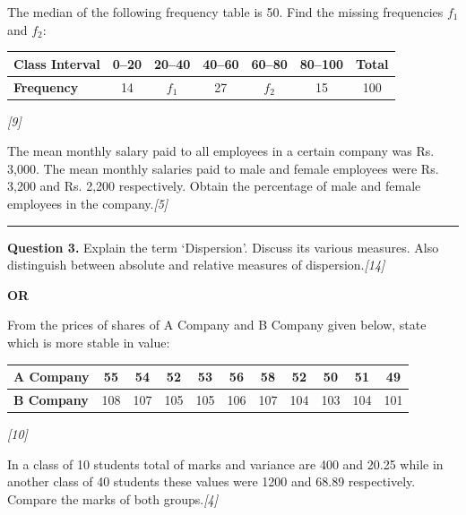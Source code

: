 \documentclass[11pt,a4paper]{article}
\newcommand{\pts}[1]{\hfill   \textit{[#1]}}
\begin{document}
\begin{parts}
  \item The median of the following frequency table is 50. Find the missing frequencies $f_1$ and $f_2$:
  
  
\begin{center}
  \small
  
\begin{tabular}{|l|c|c|c|c|c||c|}
  \hline
   \textbf{Class Interval} & 0--20 & 20--40 & 40--60 & 60--80 & 80--100 &   \textbf{Total} \\
  \hline
   \textbf{Frequency} & 14 & $f_1$ & 27 & $f_2$ & 15 & 100 \\
  \hline
  \end{tabular}
  \end{center}\pts{9}
  
  \item The mean monthly salary paid to all employees in a certain company was Rs. 3,000. The mean monthly salaries paid to male and female employees were Rs. 3,200 and Rs. 2,200 respectively. Obtain the percentage of male and female employees in the company.\pts{5}
\end{parts}

\medskip\rule{\linewidth}{0.2pt}




\noindent   \textbf{Question 3.}
Explain the term `Dispersion'. Discuss its various measures. Also distinguish between absolute and relative measures of dispersion.\pts{14}

\centerline{   \textbf{OR}}


\begin{parts}
  \item From the prices of shares of A Company and B Company given below, state which is more stable in value:
  
  
\begin{center}
  \small
  
\begin{tabular}{|l|c|c|c|c|c|c|c|c|c|c|}
  \hline
   \textbf{A Company} & 55 & 54 & 52 & 53 & 56 & 58 & 52 & 50 & 51 & 49 \\
  \hline
   \textbf{B Company} & 108 & 107 & 105 & 105 & 106 & 107 & 104 & 103 & 104 & 101 \\
  \hline
  \end{tabular}
  \end{center}\pts{10}
  
  \item In a class of 10 students total of marks and variance are 400 and 20.25 while in another class of 40 students these values were 1200 and 68.89 respectively. Compare the marks of both groups.\pts{4}
\end{parts}
\end{document}

